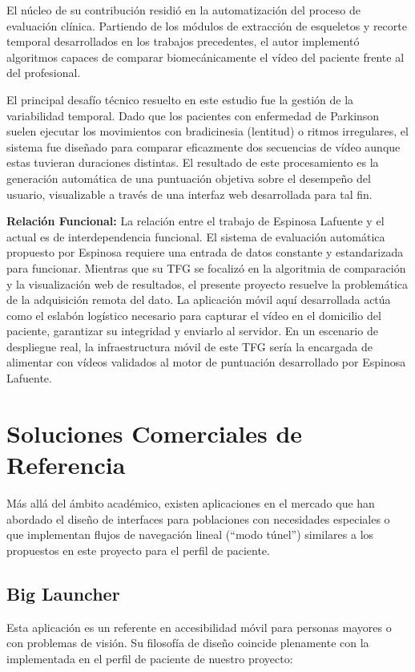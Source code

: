 El núcleo de su contribución residió en la automatización del proceso de evaluación clínica. Partiendo de los módulos de extracción de esqueletos y recorte temporal desarrollados en los trabajos precedentes, el autor implementó algoritmos capaces de comparar biomecánicamente el vídeo del paciente frente al del profesional.

El principal desafío técnico resuelto en este estudio fue la gestión de la variabilidad temporal. Dado que los pacientes con enfermedad de Parkinson suelen ejecutar los movimientos con bradicinesia (lentitud) o ritmos irregulares, el sistema fue diseñado para comparar eficazmente dos secuencias de vídeo aunque estas tuvieran duraciones distintas. El resultado de este procesamiento es la generación automática de una puntuación objetiva sobre el desempeño del usuario, visualizable a través de una interfaz web desarrollada para tal fin.

\textbf{Relación Funcional:} La relación entre el trabajo de Espinosa Lafuente y el actual es de interdependencia funcional. El sistema de evaluación automática propuesto por Espinosa requiere una entrada de datos constante y estandarizada para funcionar. Mientras que su TFG se focalizó en la algoritmia de comparación y la visualización web de resultados, el presente proyecto resuelve la problemática de la adquisición remota del dato. La aplicación móvil aquí desarrollada actúa como el eslabón logístico necesario para capturar el vídeo en el domicilio del paciente, garantizar su integridad y enviarlo al servidor. En un escenario de despliegue real, la infraestructura móvil de este TFG sería la encargada de alimentar con vídeos validados al motor de puntuación desarrollado por Espinosa Lafuente.

\section{Soluciones Comerciales de Referencia}

Más allá del ámbito académico, existen aplicaciones en el mercado que han abordado el diseño de interfaces para poblaciones con necesidades especiales o que implementan flujos de navegación lineal (``modo túnel'') similares a los propuestos en este proyecto para el perfil de paciente.

\subsection{Big Launcher}

Esta aplicación es un referente en accesibilidad móvil para personas mayores o con problemas de visión. Su filosofía de diseño coincide plenamente con la implementada en el perfil de paciente de nuestro proyecto:

